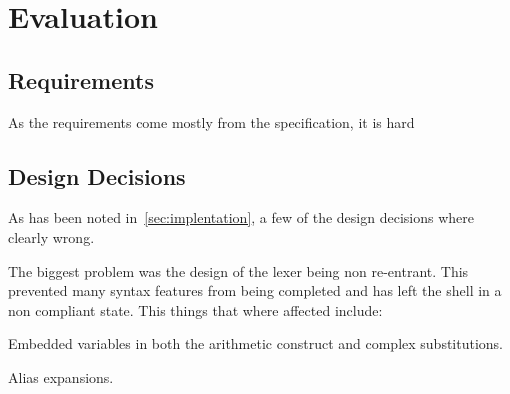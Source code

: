 \chapter{Evaluation}






\section{Requirements}
As the requirements come mostly from the specification, it is hard 


\section{Design Decisions}
As has been noted in~\ref{sec:implentation}, a few of the design decisions where clearly  wrong.

The biggest problem was the design of the lexer being non re-entrant.
This prevented many syntax features from being completed and has left the shell in a non compliant state.
This things that where affected include:
\begin{itemize*}
	\item Embedded variables in both the arithmetic construct and complex substitutions.
    \item Alias expansions.
    \
\end{itemize*}



